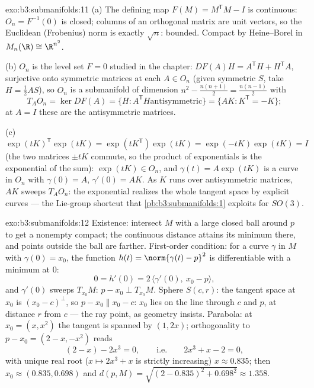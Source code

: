 \begin{solution}{exo:b3:submanifolds:11}
(a) The defining map $F(M) = M^{\mathsf T}M - I$ is
continuous: $O_n = F^{-1}(0)$ is closed; columns of an
orthogonal matrix are unit vectors, so the Euclidean
(Frobenius) norm is exactly $\sqrt n$: bounded. Compact by
Heine--Borel in $M_n(\R) \cong \R^{n^2}$.

(b) $O_n$ is the level set $F = 0$ studied in the chapter:
$DF(A)H = A^{\mathsf T}H + H^{\mathsf T}A$, surjective onto
symmetric matrices at each $A \in O_n$ (given symmetric $S$,
take $H = \frac12AS$), so $O_n$ is a submanifold of
dimension $n^2 - \frac{n(n+1)}2 = \frac{n(n-1)}2$ with
\[
T_AO_n = \ker DF(A) = \{H : A^{\mathsf T}H \text{
antisymmetric}\} = \{AK : K^{\mathsf T} = -K\} ;
\]
at $A = I$ these are the antisymmetric matrices.

(c) $\exp(tK)^{\mathsf T}\exp(tK) = \exp(tK^{\mathsf T})
\exp(tK) = \exp(-tK)\exp(tK) = I$ (the two matrices $\pm tK$
commute, so the product of exponentials is the exponential
of the sum): $\exp(tK) \in O_n$, and $\gamma(t) =
A\exp(tK)$ is a curve in $O_n$ with $\gamma(0) = A$,
$\gamma'(0) = AK$. As $K$ runs over antisymmetric matrices,
$AK$ sweeps $T_AO_n$: the exponential realizes the whole
tangent space by explicit curves --- the Lie-group shortcut
that \cref{pb:b3:submanifolds:1} exploits for $SO(3)$.
\end{solution}

\begin{solution}{exo:b3:submanifolds:12}
Existence: intersect $M$ with a large closed ball around
$p$ to get a nonempty compact; the continuous distance
attains its minimum there, and points outside the ball are
farther. First-order condition: for a curve $\gamma$ in $M$
with $\gamma(0) = x_0$, the function $h(t) = \norm{\gamma(t)
- p}^2$ is differentiable with a minimum at $0$:
\[
0 = h'(0) = 2\,\langle\gamma'(0),\ x_0 - p\rangle,
\]
and $\gamma'(0)$ sweeps $T_{x_0}M$: $p - x_0 \perp
T_{x_0}M$. Sphere $S(c, r)$: the tangent space at $x_0$ is
$(x_0 - c)^\perp$, so $p - x_0 \parallel x_0 - c$: $x_0$
lies on the line through $c$ and $p$, at distance $r$ from
$c$ --- the ray point, as geometry insists. Parabola: at
$x_0 = (x, x^2)$ the tangent is spanned by $(1, 2x)$;
orthogonality to $p - x_0 = (2 - x, -x^2)$ reads
\[
(2 - x) - 2x^3 = 0,
\qquad\text{i.e.}\qquad 2x^3 + x - 2 = 0,
\]
with unique real root ($x \mapsto 2x^3 + x$ is strictly
increasing) $x \approx 0.835$; then $x_0 \approx (0.835,
0.698)$ and $d(p, M) = \sqrt{(2 - 0.835)^2 + 0.698^2}
\approx 1.358$.
\end{solution}

